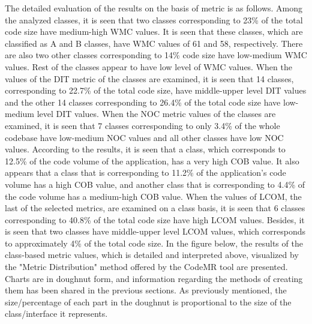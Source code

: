 The detailed evaluation of the results on the basis of metric is as follows. Among the analyzed classes, it is seen that two classes corresponding to 23\% of the total code size have medium-high WMC values. It is seen that these classes, which are classified as A and B classes, have WMC values of 61 and 58, respectively. There are also two other classes corresponding to 14\% code size have low-medium WMC values. Rest of the classes appear to have low level of WMC values.  When the values of the DIT metric of the classes are examined, it is seen that 14 classes, corresponding to 22.7\% of the total code size, have middle-upper level DIT values and the other 14 classes corresponding to 26.4\% of the total code size have low-medium level DIT values. When the NOC metric values of the classes are examined, it is seen that 7 classes corresponding to only 3.4\% of the whole codebase have low-medium NOC values and all other classes have low NOC values. According to the results, it is seen that a class, which corresponds to 12.5\% of the code volume of the application, has a very high COB value. It also appears that a class that is corresponding to 11.2\% of the application's code volume has a high COB value, and another class that is corresponding to 4.4\% of the code volume has a medium-high COB value. When the values of LCOM, the last of the selected metrics, are examined on a class basis, it is seen that 6 classes corresponding to 40.8\% of the total code size have high LCOM values. Besides, it is seen that two classes have middle-upper level LCOM values, which corresponds to approximately 4\% of the total code size. In the figure below, the results of the class-based metric values, which is detailed and interpreted above, visualized by the "Metric Distribution" method offered by the CodeMR tool are presented. Charts are in doughnut form, and information regarding the methods of creating them has been shared in the previous sections. As previously mentioned,  the size/percentage of each part in the doughnut is proportional to the size of the class/interface it represents.

